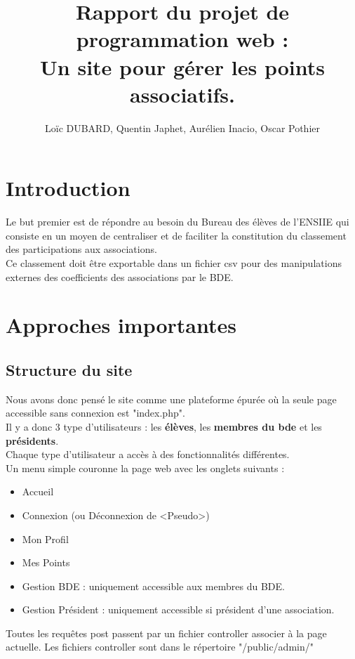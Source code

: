 \documentclass[french]{article}
\author{Loïc DUBARD, Quentin Japhet, Aurélien Inacio, Oscar Pothier}
\title{Rapport du projet de programmation web : \\
\textbf{Un site pour gérer les points associatifs}.}
\begin{document}
\maketitle
\tableofcontents
\clearpage
\section*{Introduction}
Le but premier est de répondre au besoin du Bureau des élèves de l'ENSIIE qui consiste en un moyen de centraliser et de faciliter la constitution du classement des participations aux associations.\\

 Ce classement doit être exportable dans un fichier csv pour des manipulations externes des coefficients des associations par le BDE.\\
 
 \clearpage
 
\section{Approches importantes}
\subsection{Structure du site}
Nous avons donc pensé le site comme une plateforme épurée où la seule page accessible sans connexion est "index.php".\\
 Il y a donc 3 type d'utilisateurs : les \textbf{élèves}, les \textbf{membres du bde} et les \textbf{présidents}.\\ Chaque type d'utilisateur a accès à des fonctionnalités différentes.\\ 
 
 Un menu simple couronne la page web avec les onglets suivants : 
 \begin{itemize}
 	\item Accueil
 	\item Connexion (ou Déconnexion de <Pseudo>) 
 	\item Mon Profil
 	\item Mes Points
 	\item Gestion BDE : uniquement accessible aux membres du BDE.
 	\item Gestion Président : uniquement accessible si président d'une association.\\
 \end{itemize}
 
 Toutes les requêtes post passent par un fichier controller associer à la page actuelle. Les fichiers controller sont dans le répertoire "/public/admin/"\\
 
\end{document}
